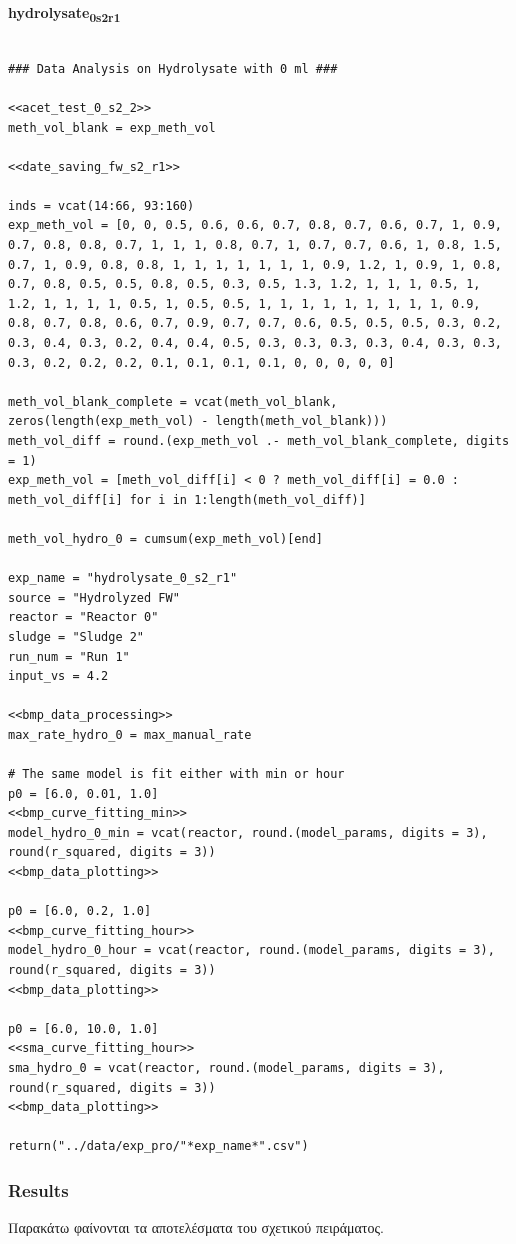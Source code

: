 \documentclass[11pt]{article}
\begin{document}
\textbf{hydrolysate\textsubscript{0}\textsubscript{s2}\textsubscript{r1}}
\begin{verbatim}

### Data Analysis on Hydrolysate with 0 ml ###

<<acet_test_0_s2_2>>
meth_vol_blank = exp_meth_vol

<<date_saving_fw_s2_r1>>

inds = vcat(14:66, 93:160)
exp_meth_vol = [0, 0, 0.5, 0.6, 0.6, 0.7, 0.8, 0.7, 0.6, 0.7, 1, 0.9, 0.7, 0.8, 0.8, 0.7, 1, 1, 1, 0.8, 0.7, 1, 0.7, 0.7, 0.6, 1, 0.8, 1.5, 0.7, 1, 0.9, 0.8, 0.8, 1, 1, 1, 1, 1, 1, 1, 0.9, 1.2, 1, 0.9, 1, 0.8, 0.7, 0.8, 0.5, 0.5, 0.8, 0.5, 0.3, 0.5, 1.3, 1.2, 1, 1, 1, 0.5, 1, 1.2, 1, 1, 1, 1, 0.5, 1, 0.5, 0.5, 1, 1, 1, 1, 1, 1, 1, 1, 1, 0.9, 0.8, 0.7, 0.8, 0.6, 0.7, 0.9, 0.7, 0.7, 0.6, 0.5, 0.5, 0.5, 0.3, 0.2, 0.3, 0.4, 0.3, 0.2, 0.4, 0.4, 0.5, 0.3, 0.3, 0.3, 0.3, 0.4, 0.3, 0.3, 0.3, 0.2, 0.2, 0.2, 0.1, 0.1, 0.1, 0.1, 0, 0, 0, 0, 0]

meth_vol_blank_complete = vcat(meth_vol_blank, zeros(length(exp_meth_vol) - length(meth_vol_blank)))
meth_vol_diff = round.(exp_meth_vol .- meth_vol_blank_complete, digits = 1)
exp_meth_vol = [meth_vol_diff[i] < 0 ? meth_vol_diff[i] = 0.0 : meth_vol_diff[i] for i in 1:length(meth_vol_diff)]

meth_vol_hydro_0 = cumsum(exp_meth_vol)[end]

exp_name = "hydrolysate_0_s2_r1"
source = "Hydrolyzed FW"
reactor = "Reactor 0"
sludge = "Sludge 2"
run_num = "Run 1"
input_vs = 4.2

<<bmp_data_processing>>
max_rate_hydro_0 = max_manual_rate

# The same model is fit either with min or hour
p0 = [6.0, 0.01, 1.0]
<<bmp_curve_fitting_min>>
model_hydro_0_min = vcat(reactor, round.(model_params, digits = 3), round(r_squared, digits = 3))
<<bmp_data_plotting>>

p0 = [6.0, 0.2, 1.0]
<<bmp_curve_fitting_hour>>
model_hydro_0_hour = vcat(reactor, round.(model_params, digits = 3), round(r_squared, digits = 3))
<<bmp_data_plotting>>

p0 = [6.0, 10.0, 1.0]
<<sma_curve_fitting_hour>>
sma_hydro_0 = vcat(reactor, round.(model_params, digits = 3), round(r_squared, digits = 3))
<<bmp_data_plotting>>

return("../data/exp_pro/"*exp_name*".csv")
\end{verbatim}

\subsubsection{Results}
\label{sec:orgce96764}
Παρακάτω φαίνονται τα αποτελέσματα του σχετικού πειράματος.
\end{document}
